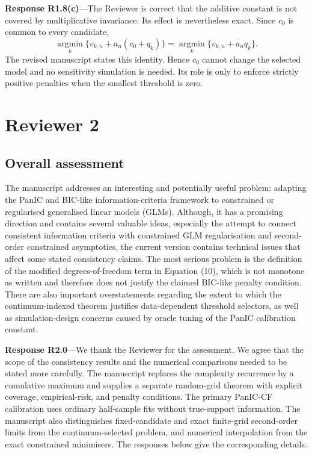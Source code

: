 \documentclass[11pt]{article}
\newcommand{\response}[1]{\par\noindent\textbf{Response #1}---}
\begin{document}
\response{R1.8(c)}The Reviewer is correct that the additive constant is not covered by multiplicative invariance. Its effect is nevertheless exact. Since $c_0$ is common to every candidate,
\[
\underset{k}{\operatorname{argmin}}\{v_{k,n}+a_n(c_0+q_k)\}
=\underset{k}{\operatorname{argmin}}\{v_{k,n}+a_nq_k\}.
\]
The revised manuscript states this identity. Hence $c_0$ cannot change the selected model and no sensitivity simulation is needed. Its role is only to enforce strictly positive penalties when the smallest threshold is zero.



\section*{Reviewer 2}

\subsection*{Overall assessment}
The manuscript addresses an interesting and potentially useful problem: adapting the PanIC and BIC-like information-criteria framework to constrained or regularised generalised linear models (GLMs). Although, it has a promising direction and contains several valuable ideas, especially the attempt to connect consistent information criteria with constrained GLM regularisation and second-order constrained asymptotics, the current version contains technical issues that affect some stated consistency claims. The most serious problem is the definition of the modified degrees-of-freedom term in Equation (10), which is not monotone as written and therefore does not justify the claimed BIC-like penalty condition. There are also important overstatements regarding the extent to which the continuum-indexed theorem justifies data-dependent threshold selectors, as well as simulation-design concerns caused by oracle tuning of the PanIC calibration constant.

\response{R2.0}We thank the Reviewer for the assessment. We agree that the scope of the consistency results and the numerical comparisons needed to be stated more carefully. The manuscript replaces the complexity recurrence by a cumulative maximum and supplies a separate random-grid theorem with explicit coverage, empirical-risk, and penalty conditions. The primary PanIC-CF calibration uses ordinary half-sample fits without true-support information. The manuscript also distinguishes fixed-candidate and exact finite-grid second-order limits from the continuum-selected problem, and numerical interpolation from the exact constrained minimisers. The responses below give the corresponding details.
\end{document}
